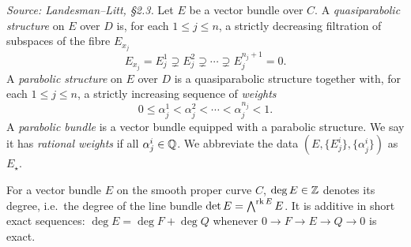 \begin{definition}
  \label{def:parabolic-bundle}
  \textit{Source: Landesman--Litt, \S2.3.}
  Let $E$ be a vector bundle over $C$. A \emph{quasiparabolic structure} on $E$
  over $D$ is, for each $1 \leq j \leq n$, a strictly decreasing filtration of
  subspaces of the fibre $E_{x_j}$
  \[
    E_{x_j} = E_j^1 \supsetneq E_j^2 \supsetneq \cdots \supsetneq E_j^{n_j+1} = 0 .
  \]
  A \emph{parabolic structure} on $E$ over $D$ is a quasiparabolic structure
  together with, for each $1 \leq j \leq n$, a strictly increasing sequence of
  \emph{weights}
  \[
    0 \leq \alpha^1_j < \alpha^2_j < \cdots < \alpha^{n_j}_j < 1 .
  \]
  A \emph{parabolic bundle} is a vector bundle equipped with a parabolic
  structure. We say it has \emph{rational weights} if all $\alpha^i_j \in \mathbb{Q}$.
  We abbreviate the data $(E, \{E^i_j\}, \{\alpha^i_j\})$ as $E_\star$.
\end{definition}

\begin{definition}
  \label{def:bundle-degree}
  For a vector bundle $E$ on the smooth proper curve $C$, $\deg E \in \mathbb{Z}$ denotes
  its degree, i.e.\ the degree of the line bundle $\det E = \bigwedge^{\operatorname{rk} E} E$.
  It is additive in short exact sequences: $\deg E = \deg F + \deg Q$ whenever
  $0 \to F \to E \to Q \to 0$ is exact.
\end{definition}

